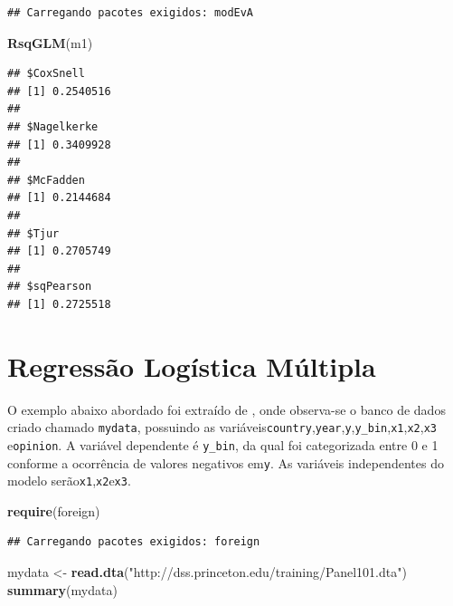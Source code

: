 \documentclass[12pt,brazil,]{book}
\newenvironment{Shaded}{\begin{snugshade}}{\end{snugshade}}
\newcommand{\KeywordTok}[1]{\textcolor[rgb]{0.13,0.29,0.53}{\textbf{#1}}}
\newcommand{\NormalTok}[1]{#1}
\newcommand{\StringTok}[1]{\textcolor[rgb]{0.31,0.60,0.02}{#1}}
\begin{document}
\begin{verbatim}
## Carregando pacotes exigidos: modEvA
\end{verbatim}

\begin{Shaded}
\begin{Highlighting}[]
\KeywordTok{RsqGLM}\NormalTok{(m1)}
\end{Highlighting}
\end{Shaded}

\begin{verbatim}
## $CoxSnell
## [1] 0.2540516
## 
## $Nagelkerke
## [1] 0.3409928
## 
## $McFadden
## [1] 0.2144684
## 
## $Tjur
## [1] 0.2705749
## 
## $sqPearson
## [1] 0.2725518
\end{verbatim}

\hypertarget{regressao-logistica-multipla}{%
\section{Regressão Logística
Múltipla}\label{regressao-logistica-multipla}}

O exemplo abaixo abordado foi extraído de \textcite{Torres-Reyna2014},
onde observa-se o banco de dados criado chamado \texttt{mydata},
possuindo as
variáveis\texttt{country},\texttt{year},\texttt{y},\texttt{y\_bin},\texttt{x1},\texttt{x2},\texttt{x3}
e\texttt{opinion}. A variável dependente é \texttt{y\_bin}, da qual foi
categorizada entre 0 e 1 conforme a ocorrência de valores negativos
em\texttt{y}. As variáveis independentes do modelo
serão\texttt{x1},\texttt{x2}e\texttt{x3}.

\begin{Shaded}
\begin{Highlighting}[]
\KeywordTok{require}\NormalTok{(foreign)}
\end{Highlighting}
\end{Shaded}

\begin{verbatim}
## Carregando pacotes exigidos: foreign
\end{verbatim}

\begin{Shaded}
\begin{Highlighting}[]
\NormalTok{mydata <-}\StringTok{ }\KeywordTok{read.dta}\NormalTok{(}\StringTok{"http://dss.princeton.edu/training/Panel101.dta"}\NormalTok{) }
\KeywordTok{summary}\NormalTok{(mydata)}
\end{Highlighting}
\end{Shaded}
\end{document}
